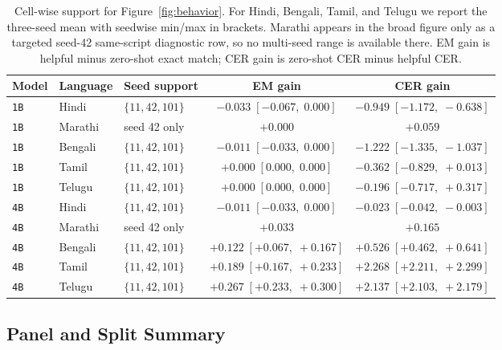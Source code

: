 \documentclass{article}
\begin{document}
\begin{table}[H]
\centering
\small
\setlength{\tabcolsep}{7pt}
\begin{tabular}{lllcc}
\toprule
\textbf{Model} & \textbf{Language} & \textbf{Seed support} & \textbf{EM gain} & \textbf{CER gain} \\
\midrule
\texttt{1B} & Hindi   & $\{11, 42, 101\}$ & $-0.033\;[-0.067,\;0.000]$ & $-0.949\;[-1.172,\;-0.638]$ \\
\texttt{1B} & Marathi & seed 42 only      & $+0.000$                     & $+0.059$                      \\
\texttt{1B} & Bengali & $\{11, 42, 101\}$ & $-0.011\;[-0.033,\;0.000]$ & $-1.222\;[-1.335,\;-1.037]$ \\
\texttt{1B} & Tamil   & $\{11, 42, 101\}$ & $+0.000\;[0.000,\;0.000]$  & $-0.362\;[-0.829,\;+0.013]$ \\
\texttt{1B} & Telugu  & $\{11, 42, 101\}$ & $+0.000\;[0.000,\;0.000]$  & $-0.196\;[-0.717,\;+0.317]$ \\
\midrule
\texttt{4B} & Hindi   & $\{11, 42, 101\}$ & $-0.011\;[-0.033,\;0.000]$ & $-0.023\;[-0.042,\;-0.003]$ \\
\texttt{4B} & Marathi & seed 42 only      & $+0.033$                     & $+0.165$                      \\
\texttt{4B} & Bengali & $\{11, 42, 101\}$ & $+0.122\;[+0.067,\;+0.167]$ & $+0.526\;[+0.462,\;+0.641]$ \\
\texttt{4B} & Tamil   & $\{11, 42, 101\}$ & $+0.189\;[+0.167,\;+0.233]$ & $+2.268\;[+2.211,\;+2.299]$ \\
\texttt{4B} & Telugu  & $\{11, 42, 101\}$ & $+0.267\;[+0.233,\;+0.300]$ & $+2.137\;[+2.103,\;+2.179]$ \\
\bottomrule
\end{tabular}
\caption{Cell-wise support for Figure~\ref{fig:behavior}. For Hindi, Bengali, Tamil, and Telugu we report the three-seed mean with seedwise min/max in brackets. Marathi appears in the broad figure only as a targeted seed-42 same-script diagnostic row, so no multi-seed range is available there. EM gain is helpful minus zero-shot exact match; CER gain is zero-shot CER minus helpful CER.}
\label{tab:behavior_seed_ranges}
\end{table}

\subsection{Panel and Split Summary}\label{app:panelsummary}
\end{document}
